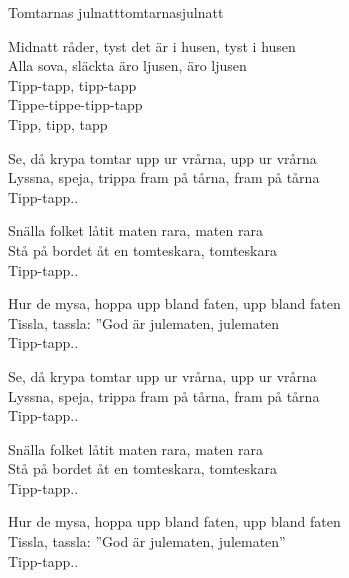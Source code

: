 \begin{song}{Tomtarnas julnatt}{tomtarnasjulnatt}
\begin{vers}
Midnatt råder, tyst det är i husen, tyst i husen\\
Alla sova, släckta äro ljusen, äro ljusen\\
Tipp-tapp, tipp-tapp\\
Tippe-tippe-tipp-tapp\\
Tipp, tipp, tapp\\
\end{vers}
\begin{vers}
Se, då krypa tomtar upp ur vrårna, upp ur vrårna\\
Lyssna, speja, trippa fram på tårna, fram på tårna\\
Tipp-tapp..\\
\end{vers}
\begin{vers}
Snälla folket låtit maten rara, maten rara\\
Stå på bordet åt en tomteskara, tomteskara\\
Tipp-tapp..\\
\end{vers}
\begin{vers}
Hur de mysa, hoppa upp bland faten, upp bland faten\\
Tissla, tassla: ''God är julematen, julematen\\
Tipp-tapp..\\
\end{vers}
\begin{vers}
Se, då krypa tomtar upp ur vrårna, upp ur vrårna\\
Lyssna, speja, trippa fram på tårna, fram på tårna\\
Tipp-tapp..\\
\end{vers}
\begin{vers}
Snälla folket låtit maten rara, maten rara\\
Stå på bordet åt en tomteskara, tomteskara\\
Tipp-tapp..\\
\end{vers}
\newp
\begin{vers}
Hur de mysa, hoppa upp bland faten, upp bland faten\\
Tissla, tassla: ''God är julematen, julematen''\\
Tipp-tapp..\\
\end{vers}
\begin{vers}

\end{vers}
\end{song}
